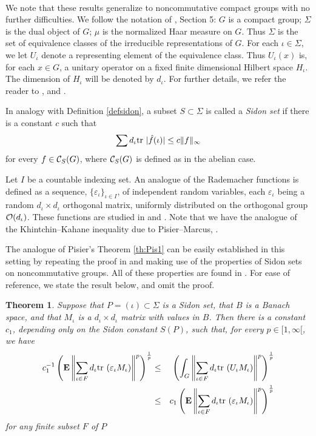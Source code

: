\def\tr{{\rm tr}\ }

\

We note that these results generalize to noncommutative
compact groups with no further difficulties.
We follow the notation of \cite{bib:Pi2}, Section 5:  $G$ is a compact
group;
$\Sigma$ is the dual object of $G$; $\mu$ is the normalized Haar
measure on $G$.  Thus $\Sigma$ is the set of equivalence classes of the
irreducible representations of $G$.  For each $\iota\in\Sigma$, we let
$U_\iota$ denote a representing element of the equivalence class.  Thus
$U_\iota (x)$ is, for each $x\in G$, a unitary operator on a fixed finite
dimensional Hilbert space $H_\iota$.  The dimension of $H_\iota$ will be
denoted by
$d_\iota$.  
For further details, we refer the reader to \cite{bib:Pi2}, and
\cite{bib:AHA2}.  

In analogy with Definition \ref{defsidon}, a subset
$S\subset\Sigma$ is called a {\em Sidon set} if there is a constant $c$
such that
$$\sum d_\iota\tr |\hat{f}(\iota)|\leq c\| f\|_\infty$$
for every $f\in{\cal C}_S(G)$, where ${\cal C}_S(G)$ is defined as in the 
abelian case.
\def\eps{\varepsilon_\iota}

Let $I$ be a countable indexing set.  An analogue of the Rademacher
functions is defined as a sequence, $\{\eps\}_{\iota\in I}$, of
independent random variables, each $\eps$ being a random $d_\iota\times
d_\iota$ orthogonal matrix, uniformly distributed on the orthogonal group
${\cal O}(d_\iota )$.  These functions are studied in \cite{bib:Pi2} and
\cite{bib:MP}.  Note that we have the analogue of the
Khintchin--Kahane inequality due to 
Pisier--Marcus,
\cite[Corollary 2.12, p. 91]{bib:MP}.

The analogue of Pisier's Theorem \ref{th:Pis1} can be easily
established in this
setting by repeating the proof in \cite{bib:Pi1} and making use of the
properties of Sidon sets on noncommutative groups.  All of these
properties are
found in \cite[Theorem (37.2)]{bib:AHA2}.  For ease of reference, we
state the result below, and omit the proof.

\newtheorem{th:Pis1.noncom}[join]{Theorem}
\begin{th:Pis1.noncom}
Suppose that $P = (\iota) \subset \Sigma $ is a Sidon set, that
$B$ is a Banach space, and that $M_\iota$ is a $d_\iota\times
d_\iota$ matrix with values in $B$. Then there is
a constant $c_1$, depending only on the Sidon constant $S(P)$, such that,
for every $p \in [1, \infty [$, we have
\begin{eqnarray}
c_1^{-1}\left( {\bf E}\left\| \sum_{\iota\in F}
d_\iota\tr (\eps M_\iota ) \right\|^p\right)^{\frac{1}{p}}
& \leq &
\left( \int_G\left\| \sum_{\iota\in F}
d_\iota\tr (U_\iota M_\iota ) \right\|^p\right)^{\frac{1}{p}} \nonumber
\\
& \leq &
c_1\left( {\bf E}\left\| \sum_{\iota\in F}
d_\iota\tr (\eps M_\iota )\right\|^p\right)^{\frac{1}{p}}
\label{ineq:Pis.noncom}
\end{eqnarray}
for any finite subset $F$ of $P$

\label{th:Pis1.noncom}
\end{th:Pis1.noncom}

